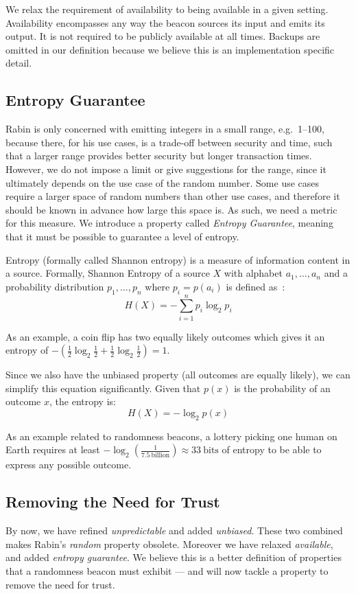 We relax the requirement of availability to being available in a given setting.
Availability encompasses any way the beacon sources its input and emits its output.
It is not required to be publicly available at all times.
Backups are omitted in our definition because we believe this is an implementation specific detail.

\subsection{Entropy Guarantee}
Rabin is only concerned with emitting integers in a small range, e.g.\ 1--100, because there, for his use cases, is a trade-off between security and time, such that a larger range provides better security but longer transaction times.
However, we do not impose a limit or give suggestions for the range, since it ultimately depends on the use case of the random number.
Some use cases require a larger space of random numbers than other use cases, and therefore it should be known in advance how large this space is.
As such, we need a metric for this measure.
We introduce a property called \emph{Entropy Guarantee}, meaning that it must be possible to guarantee a level of entropy.

Entropy (formally called Shannon entropy) is a measure of information content in a source.
Formally, Shannon Entropy of a source $X$ with alphabet ${a_1, \ldots, a_n}$ and a probability distribution ${p_1, \ldots , p_n}$ where $p_i = p(a_i)$ is defined as~\cite{informationtheory}:
\[
H(X) = -\sum\limits_{i = 1}^n p_{i}\log_{2} p_{i}
\]

As an example, a coin flip has two equally likely outcomes which gives it an entropy of $-\left(\frac{1}{2}\log_2 \frac{1}{2} + \frac{1}{2}\log_2 \frac{1}{2}\right) = 1$.

Since we also have the unbiased property (all outcomes are equally likely), we can simplify this equation significantly. Given that $p(x)$ is the probability of an outcome $x$, the entropy is:
\[
    H(X) = -\log_{2}p(x)
\]

As an example related to randomness beacons, a lottery picking one human on Earth requires at least $-\log_2\left(\frac{1}{7.5~\text{billion}}\right) \approx 33~\text{bits}$ of entropy to be able to express any possible outcome.

\subsection{Removing the Need for Trust}
By now, we have refined \emph{unpredictable} and added \emph{unbiased}.
These two combined makes Rabin's \emph{random} property obsolete.
Moreover we have relaxed \emph{available}, and added \emph{entropy guarantee}.
We believe this is a better definition of properties that a randomness beacon must exhibit --- and will now tackle a property to remove the need for trust.

